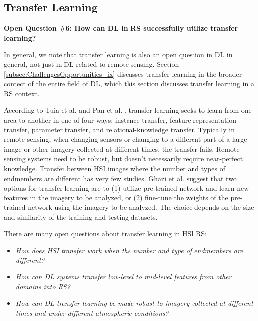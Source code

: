 \documentclass[12pt]{spieman}
\begin{document}
\begin{spacing}{1}
\subsection{Transfer Learning} \label{subsec:ChallengesOpportunities_vi} \textbf{Open Question \#6: How can DL in RS successfully utilize transfer learning?}

In general, we note that transfer learning is also an open question in DL in general, not just in DL related to remote sensing. Section \ref{subsec:ChallengesOpportunities_ix} discusses transfer learning in the broader contect of the entire field of DL, which this section discusses transfer learning in a RS context.

According to Tuia et al. \cite{tuia2016domain} and Pan et al. \cite{pan2010survey} , transfer learning seeks to learn from one area to another in one of four ways: instance-transfer, feature-representation transfer, parameter transfer, and relational-knowledge transfer. Typically in remote sensing, when changing sensors or changing to a different part of a large image or other imagery collected at different times, the transfer fails. Remote sensing systems need to be robust, but doesn't necessarily require near-perfect knowledge. Transfer between HSI images where the number and types of endmembers are different has very few studies. Ghazi et al. \cite{ghazi2017plant} suggest that two options for transfer learning are to (1) utilize pre-trained network and learn new features in the imagery to be analyzed, or (2) fine-tune the weights of the pre-trained network using the imagery to be analyzed. The choice depends on the size and similarity of the training and testing datasets.

There are many open questions about transfer learning in HSI RS:
\begin{itemize}
    \setlength{\parskip}{0pt}
    \setlength{\itemsep}{0pt plus 1pt}
    \item \textit{How does HSI transfer work when the number and type of endmembers are different?}
    \item \textit{How can DL systems transfer low-level to mid-level features from other domains into RS?}
    \item \textit{How can DL transfer learning be made robust to imagery collected at different times and under different atmospheric conditions?}
\end{itemize}


\end{spacing}
\end{document}
